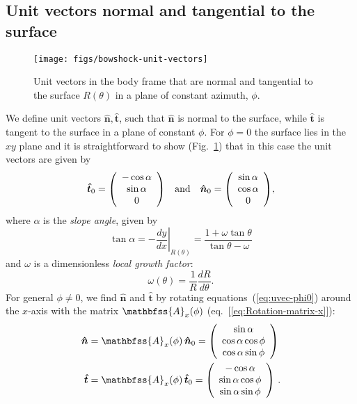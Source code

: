 \documentclass[useAMS, usenatbib, a4paper]{mnras}
\newenvironment{Vector}{\left(\begin{array}{c}}{\end{array}\right)}
\newcommand\uvec[1]{\bm{\hat{#1}}}
\begin{document}
\subsection{Unit vectors normal and tangential to the surface}
\label{sec:unit-vectors-normal}
\begin{figure}
  \centering
  \texttt{[image: figs/bowshock-unit-vectors]}
  \caption{Unit vectors in the body frame that are normal and
    tangential to the surface \(R(\theta)\) in a plane of constant
    azimuth, \(\phi\).}
  \label{fig:unitvec}
\end{figure}
We define unit vectors \(\uvec{n}, \uvec{t}\), such that \(\uvec{n}\) is normal to the surface, while \(\uvec{t}\) is tangent to the surface in a plane of constant \(\phi\). For \(\phi = 0\) the surface lies in the \(xy\) plane and it is straightforward to show (Fig.~\ref{fig:unitvec}) that in this case the unit vectors are given by 
\begin{equation}
  \label{eq:uvec-phi0}
  \uvec{t}_0 =
  \begin{Vector}
    -\cos\alpha \\ \sin\alpha \\ 0
  \end{Vector}
  \quad \mathrm{and} \quad
  \uvec{n}_0 =
  \begin{Vector}
    \sin\alpha \\ \cos\alpha \\ 0
  \end{Vector}, 
\end{equation}
where \(\alpha\) is the \textit{slope angle}, given by
\begin{equation}
  \label{eq:alpha}
  \tan\alpha = -\left.\frac{dy}{dx}\right\vert_{R(\theta)} 
  = \frac{1 + \omega \tan\theta}{\tan\theta - \omega}
\end{equation}
and \(\omega\) is a dimensionless \textit{local growth factor}:
\begin{equation}
  \label{eq:omega}
  \omega(\theta) = \frac{1}{R} \frac{dR}{d\theta} . 
\end{equation}
For general \(\phi \ne 0\), we find \(\uvec{n}\) and \(\uvec{t}\) by
rotating equations~(\ref{eq:uvec-phi0}) around the \(x\)-axis with the
matrix \(\mathbfss{A}_x(\phi)\) (eq.~[\ref{eq:Rotation-matrix-x}]):
\begin{align}
  \label{eq:uvec-n-phi}
  \uvec{n} &= \mathbfss{A}_x(\phi) \, \uvec{n}_0 =
  \begin{Vector}
    \sin\alpha \\ \cos\alpha\cos\phi \\ \cos\alpha\sin\phi
  \end{Vector}  \\
  \label{eq:uvec-t-phi}
  \uvec{t} &= \mathbfss{A}_x(\phi) \, \uvec{t}_0 =
  \begin{Vector}
    -\cos\alpha \\ \sin\alpha\cos\phi \\ \sin\alpha\sin\phi
  \end{Vector} \ .
\end{align}
\end{document}
